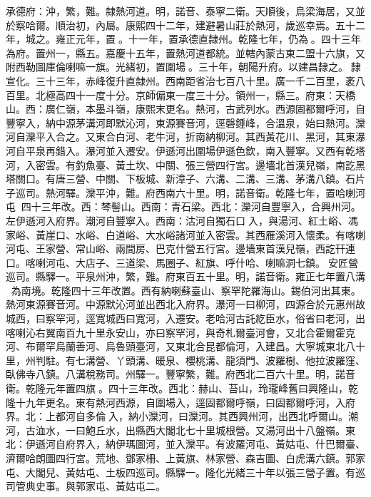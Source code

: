 \begin{pinyinscope}
承德府：沖，繁，難。隸熱河道。明，諾音、泰寧二衛。天順後，烏梁海居，又並於察哈爾。順治初，內屬。康熙四十二年，建避暑山莊於熱河，歲巡幸焉。五十二年，城之。雍正元年，置。十一年，置承德直隸州。乾隆七年，仍為。四十三年為府。置州一，縣五。嘉慶十五年，置熱河道都統。並轄內蒙古東二盟十六旗，又附西勒圖庫倫喇嘛一旗。光緒初，置圍場。三十年，朝陽升府。以建昌隸之。隸宣化。三十三年，赤峰復升直隸州。西南距省治七百八十里。廣一千二百里，袤八百里。北極高四十一度十分。京師偏東一度三十分。領州一，縣三。府東：天橋山。西：廣仁嶺，本墨斗嶺，康熙末更名。熱河，古武列水。西源固都爾呼河，自豐寧入，納中源茅溝河即默沁河，東源賽音河，逕磬錘峰，合溫泉，始曰熱河。灤河自灤平入合之。又東合白河、老牛河，折南納柳河。其西黃花川、黑河，其東瀑河自平泉再錯入。瀑河並入遷安。伊遜河出圍場伊遜色欽，南入豐寧。又西有乾塔河，入密雲。有釣魚臺、黃土坎、中關、張三營四行宮。邊墻北首漢兒嶺，南訖黑塔關口。有唐三營、中關、下板城、新漳子、六溝、二溝、三溝、茅溝八鎮。石片子巡司。熱河驛。灤平沖，難。府西南六十里。明，諾音衛。乾隆七年，置哈喇河屯，四十三年改。西：棽髻山。西南：青石梁。西北：灤河自豐寧入，合興州河。左伊遜河入府界。潮河自豐寧入。西南：沽河自獨石口入，與湯河、紅土峪、馮家峪、黃崖口、水峪、白道峪、大水峪諸河並入密雲。其西雁溪河入懷柔。有喀喇河屯、王家營、常山峪、兩間房、巴克什營五行宮。邊墻東首漢兒嶺，西訖幵連口。喀喇河屯、大店子、三道梁、馬圈子、紅旗、呼什哈、喇嘛洞七鎮。安匠營巡司。縣驛一。平泉州沖，繁，難。府東百五十里。明，諾音衛。雍正七年置八溝，為南境。乾隆四十三年改置。西有納喇蘇臺山、察罕陀羅海山。錫伯河出其東。熱河東源賽音河。中源默沁河並出西北入府界。瀑河一曰柳河，四源合於元惠州故城西，曰察罕河，逕寬城西曰寬河，入遷安。老哈河古託紇臣水，俗省曰老河，出喀喇沁右翼南百九十里永安山，亦曰察罕河，與奇札爾臺河會，又北合霍爾霍克河、布爾罕烏蘭善河、烏魯頭臺河，又東北合昆都倫河，入建昌。大寧城東北八十里，州判駐。有七溝營、丫頭溝、暖泉、櫻桃溝、龍須門、波羅樹、他拉波羅窪、臥佛寺八鎮。八溝稅務司。州驛一。豐寧繁，難。府西北二百六十里。明，諾音衛。乾隆元年置四旗。四十三年改。西北：赫山、苔山，玲瓏峰舊曰興隆山，乾隆十九年更名。東有熱河西源，自圍場入，逕固都爾呼嶺，曰固都爾呼河，入府界。北：上都河自多倫入，納小灤河，曰灤河。其西興州河，出西北呼爾山。潮河，古洫水，一曰鮑丘水，出縣西大閣北七十里城根營。又湯河出十八盤嶺。東北：伊遜河自府界入，納伊瑪圖河，並入灤平。有波羅河屯、黃姑屯、什巴爾臺、濟爾哈朗圖四行宮。荒地、鄧家柵、上黃旗、林家營、森吉圖、白虎溝六鎮。郭家屯、大閣兒、黃姑屯、土板四巡司。縣驛一。隆化光緒三十年以張三營子置。有巡司管典史事。與郭家屯、黃姑屯二。


\end{pinyinscope}
